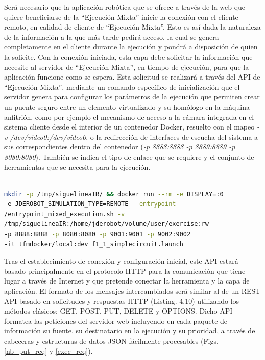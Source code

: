 Será necesario que la aplicación robótica que se ofrece a través de la web que quiere beneficiarse de la ``Ejecución Mixta'' inicie la conexión con el cliente remoto, en calidad de cliente de ``Ejecución Mixta''. Esto es así dada la naturaleza de la información a la que más tarde pedirá acceso, la cual se genera completamente en el cliente durante la ejecución y pondrá a disposición de quien la solicite. Con la conexión iniciada, esta capa debe solicitar la información que necesite al servidor de ``Ejecución Mixta'', en tiempo de ejecución, para que la aplicación funcione como se espera. Esta solicitud se realizará a través del API de ``Ejecución Mixta'', mediante un comando específico de inicialización que el servidor genera para configurar los parámetros de la ejecución que permiten crear un puente seguro entre un elemento virtualizado y su homólogo en la máquina anfitrión, como por ejemplo el mecanismo de acceso a la cámara integrada en el sistema cliente desde el interior de un contenedor Docker, resuelto con el mapeo \textit{-v /dev/video0:/dev/video0}, o la redirección de interfaces de escucha del sistema a sus correspondientes dentro del contenedor (\textit{-p 8888:8888 -p 8889:8889 -p 8080:8080}). También se indica el tipo de enlace que se requiere y el conjunto de herramientas que se necesita para la ejecución.

\begin{lstlisting}[language=bash, caption=Comando de configuración de Ejecución Mixta]

mkdir -p /tmp/siguelineaIR/ && docker run --rm -e DISPLAY=:0
-e JDEROBOT_SIMULATION_TYPE=REMOTE --entrypoint 
/entrypoint_mixed_execution.sh -v 
/tmp/siguelineaIR:/home/jderobot/volume/user/exercise:rw 
-p 8888:8888 -p 8080:8080 -p 9001:9001 -p 9002:9002 
-it tfmdocker/local:dev f1_1_simplecircuit.launch

\end{lstlisting}

Tras el establecimiento de conexión y configuración inicial, este API estará basado principalmente en el protocolo HTTP para la comunicación que tiene lugar a través de Internet y que pretende conectar la herramienta y la capa de aplicación. El formato de los mensajes intercambiados será similar al de un REST API basado en solicitudes y respuestas HTTP (Listing. 4.10) utilizando los métodos clásicos: GET, POST, PUT, DELETE y OPTIONS. Dicho API formatea las peticiones del servidor web incluyendo en cada paquete de información su fuente, su destinatario en la ejecución y su prioridad, a través de cabeceras y estructuras de datos JSON fácilmente procesables (Figs. \ref{nb_put_req} y \ref{exec_req}).

